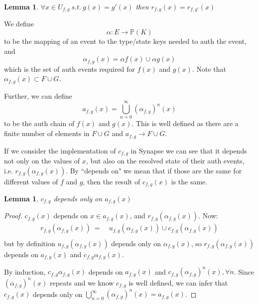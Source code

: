 \documentclass{article}
\newtheorem{lemma}[theorem]{Lemma}
\begin{document}
\begin{lemma}
	$\forall x \in U_{f,g} \ s.t.\ g(x) = g'(x)$ then $r_{f,g}(x) = r_{f,g'}(x)$
\end{lemma}

We define 
\begin{equation}
\alpha: E \rightarrow \mathbb{P}(K)
\end{equation} to be the mapping of an event to the type/state keys needed to auth the event, and
\begin{equation}
\alpha_{f,g}(x) = \alpha f(x) \cup \alpha g(x)
\end{equation} which is the set of auth events required for $f(x)$ and $g(x)$. Note that $\alpha_{f,g}(x) \subset F \cup G$.

Further, we can define
\begin{equation}
a_{f,g}(x) = \bigcup_{n=0}^\infty (\alpha_{f,g})^n(x)
\end{equation} to be the auth chain of $f(x)$ and $g(x)$. This is well defined as there are a finite number of elements in $F \cup G$ and $a_{f,g} \rightarrow F \cup G$.

If we consider the implementation of $c_{f,g}$ in Synapse we can see that it depends not only on the values of $x$, but also on the resolved state of their auth events, i.e. $r_{f,g}(\alpha_{f,g}(x))$. By ``depends on" we mean that if those are the same for different values of $f$ and $g$, then the result of $c_{f,g}(x)$ is the same.

\begin{lemma}
	 $c_{f,g}$ depends only on $a_{f,g}(x)$
\end{lemma}

\begin{proof}
	$c_{f,g}(x)$ depends on $x \in a_{f,g}(x)$, and $r_{f,g}(\alpha_{f,g}(x))$. Now:
	\[
		\begin{split}
		r_{f,g}(\alpha_{f,g}(x))\ =\ & u_{f,g}(\alpha_{f,g}(x)) \cup c_{f,g}(\alpha_{f,g}(x))\\
		\end{split}
	\] but by definition $u_{f,g}(\alpha_{f,g}(x))$ depends only on $\alpha_{f,g}(x)$, so $r_{f,g}(\alpha_{f,g}(x))$ depends on $a_{f,g}(x)$ and $c_{f,g}\alpha_{f,g}(x)$.
	
	By induction, $c_{f,g}\alpha_{f,g}(x)$ depends on $a_{f,g}(x)$ and $c_{f,g}(\alpha_{f,g})^n(x), \forall n$. Since $(\alpha_{f,g})^n(x)$ repeats and we know $c_{f,g}$ is well defined, we can infer that $c_{f,g}(x)$ depends only on $\bigcup_{n=0}^\infty (\alpha_{f,g})^n(x) = a_{f,g}(x)$.
	
\end{proof}
\end{document}
